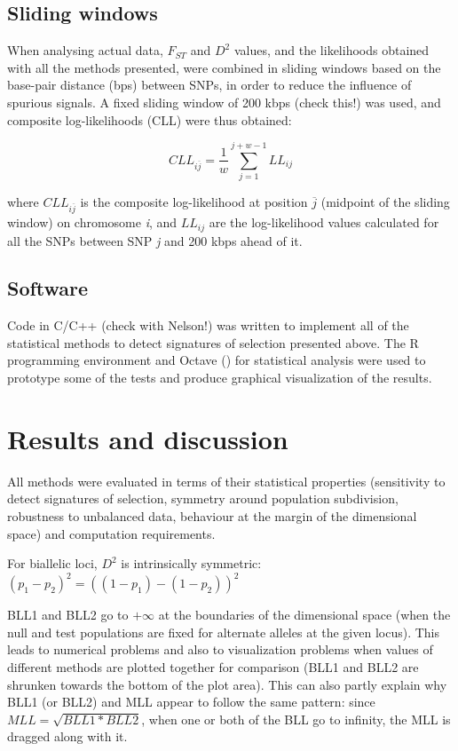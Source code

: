 \documentclass{bmcart}
\begin{document}
\subsection*{Sliding windows}
When analysing actual data, $F_{ST}$ and $D^2$ values, and the likelihoods obtained with all the
methods presented, were combined in sliding windows based on the
base-pair distance (bps) between SNPs, in order to reduce the influence of spurious signals.
A fixed sliding window of 200 kbps (check this!) was used, and composite log-likelihoods (CLL) were thus obtained:

\begin{equation}
CLL_{i\overline{j}}=\frac{1}{w}\sum_{j=1}^{j+w-1}LL_{ij}
\end{equation}

where $CLL_{i\overline{j}}$ is the composite log-likelihood at position \emph{$\overline{j}$}
(midpoint of the sliding window) on chromosome \emph{i}, and $LL_{ij}$
are the log-likelihood values calculated for all the SNPs between SNP
\emph{j} and 200 kbps ahead of it.

\subsection*{Software}
Code in C/C++ (check with Nelson!) was written to implement all of the statistical methods to
detect signatures of selection presented above. The R programming
environment and Octave (\cite{eaton2002gnu}) for statistical analysis were used to prototype some of the
tests and produce graphical visualization of the results.


\section*{Results and discussion}
All methods were evaluated in terms of their statistical properties
(sensitivity to detect signatures of selection, symmetry around
population subdivision, robustness to unbalanced data, behaviour at the
margin of the dimensional space) and computation requirements.

For biallelic loci, $D^2$ is intrinsically symmetric: $(p_1-p_2)^2 =
((1-p_1)-(1-p_2))^2$

BLL1 and BLL2 go to $+\infty$ at the boundaries of the dimensional space
(when the null and test populations are fixed for alternate alleles at
the given locus). This leads to numerical problems and also to
visualization problems when values of different methods are plotted
together for comparison (BLL1 and BLL2 are shrunken towards the bottom
of the plot area). This can also partly explain why BLL1 (or BLL2) and
MLL appear to follow the same pattern: since $MLL=\sqrt{BLL1*BLL2}$,
when one or both of the BLL go to infinity, the MLL is dragged along
with it.
\end{document}
